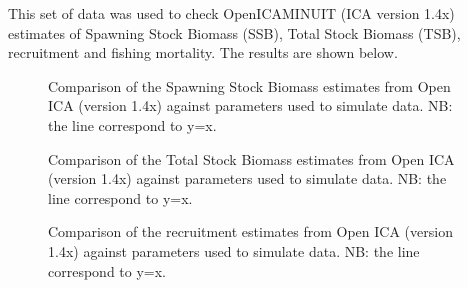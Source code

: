 This set of data was used to check OpenICAMINUIT (ICA version 1.4x) estimates of Spawning Stock Biomass (SSB), Total Stock Biomass (TSB), recruitment and fishing mortality. The results are shown below.

\begin{figure}
	\begin{center}
	\end{center}
	\caption{Comparison of the Spawning Stock Biomass estimates from Open ICA (version 1.4x) against parameters used to simulate data. NB: the line correspond to y=x.}
\end{figure}

 \begin{figure}
  	\begin{center}
  	\end{center}
  	\caption{Comparison of the Total Stock Biomass estimates from Open ICA (version 1.4x) against parameters used to simulate data. NB: the line correspond to y=x.}
  \end{figure}

  \begin{figure}
  	\begin{center}
  	\end{center}
  	\caption{Comparison of the recruitment estimates from Open ICA (version 1.4x) against parameters used to simulate data. NB: the line correspond to y=x.}
  \end{figure}


